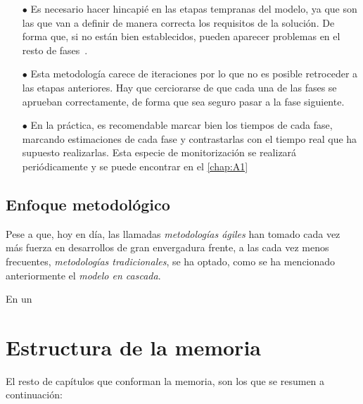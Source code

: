 \begin{itemize}
   \item[$\bullet$] Es necesario hacer hincapié en las etapas tempranas del modelo, ya que son
   las que van a definir de manera correcta los requisitos de la solución. De forma que, si no están bien establecidos, pueden 
   aparecer problemas en el resto de fases~\cite{wiegers2013software}.
   \item[$\bullet$] Esta metodología carece de iteraciones por lo que no es posible retroceder a las etapas anteriores.
   Hay que cerciorarse de que cada una de las fases se aprueban correctamente, de forma que sea seguro pasar a la
   fase siguiente.
   \item[$\bullet$] En la práctica, es recomendable marcar bien los tiempos de cada fase, marcando estimaciones de cada fase y contrastarlas con
   el tiempo real que ha supuesto realizarlas. Esta especie de monitorización se realizará periódicamente y se puede encontrar 
   en el \autoref{chap:A1}
\end{itemize}

\subsection{Enfoque metodológico}

Pese a que, hoy en día, las llamadas \textit{metodologías ágiles} han tomado cada vez más fuerza en desarrollos 
de gran envergadura frente, a las cada vez menos frecuentes, \textit{metodologías tradicionales}, se ha optado, como se ha mencionado
anteriormente el \textit{modelo en cascada}.

En un 

\section{Estructura de la memoria} %

El resto de capítulos que conforman la memoria, son los que se resumen a continuación:


